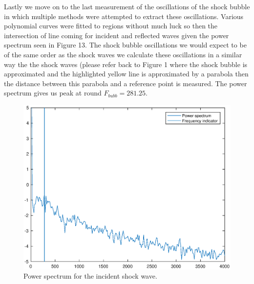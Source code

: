 \documentclass[a4paper,10pt,twoside]{article}
\begin{document}
\begin{multicols}{2}
Lastly we move on to the last measurement of the oscillations of the shock bubble in which multiple methods were attempted to extract these oscillations. Various polynomial curves were fitted to regions without much luck so then the intersection of line coming for incident and reflected waves given the power spectrum seen in Figure 13. The shock bubble oscillations we would expect to be of the same order as the shock waves we calculate these oscillations in a similar way the the shock waves (please refer back to Figure 1 where the shock bubble is approximated and the highlighted yellow line is approximated by a parabola then the distance between this parabola and a reference point is measured. The power spectrum gives us peak at round $F_{bubb} =  281.25 $.



\begin{figure}[H]
    \centering
    \includegraphics[width=\linewidth]{bublowres.eps}
    \caption{Power spectrum for the incident shock wave.}
    \label{fig:my_label}
\end{figure}




\end{multicols}
\end{document}
